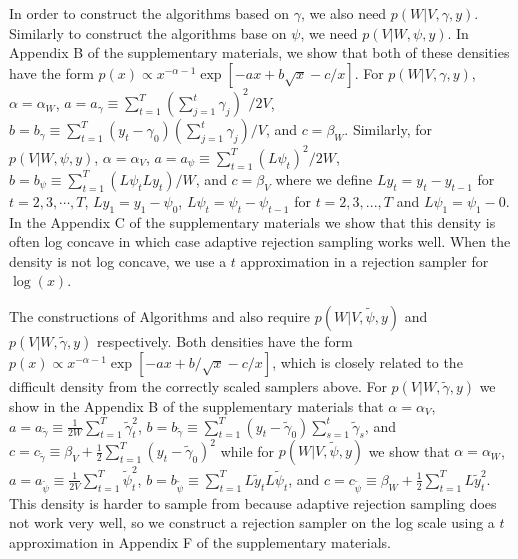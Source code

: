 \documentclass[12pt]{article}
\begin{document}
In order to construct the algorithms based on $\gamma$, we also need $p(W|V,\gamma,y)$. Similarly to construct the algorithms base on $\psi$, we need $p(V|W,\psi,y)$. In Appendix B of the supplementary materials, we show that both of these densities have the form $p(x)\propto x^{-\alpha-1}\exp\left[ -ax + b\sqrt{x} -c/x\right]$. For $p(W|V,\gamma,y)$, $\alpha=\alpha_W$, $a=a_\gamma \equiv \sum_{t=1}^T(\sum_{j=1}^t\gamma_j)^2/2V$, $b=b_\gamma \equiv\sum_{t=1}^T(y_t-\gamma_0)(\sum_{j=1}^t\gamma_j)/V$, and $c=\beta_W$. Similarly, for $p(V|W,\psi,y)$, $\alpha=\alpha_V$, $a=a_{\psi}\equiv\sum_{t=1}^T(L\psi_t)^2/2W$, $b=b_{\psi}\equiv\sum_{t=1}^T(L\psi_tLy_t)/W$, and $c=\beta_V$ where we define $Ly_t=y_t-y_{t-1}$ for $t=2,3,\cdots,T$, $Ly_1=y_1 - \psi_0$, $L\psi_t = \psi_t - \psi_{t-1}$ for $t=2,3,...,T$ and $L\psi_1=\psi_1-0$. In the Appendix C of the supplementary materials we show that this density is often log concave in which case adaptive rejection sampling \citep{gilks1992adaptive} works well. When the density is not log concave, we use a $t$ approximation in a rejection sampler for $\log(x)$.

The constructions of Algorithms  and  also require $p(W|V,\tilde{\psi},y)$ and $p(V|W,\tilde{\gamma},y)$ respectively. Both densities have the form $p(x)\propto x^{-\alpha-1}\exp\left[ -ax + b/\sqrt{x} -c/x\right]$, which is closely related to the difficult density from the correctly scaled samplers above.  For $p(V|W,\tilde{\gamma},y)$ we show in the Appendix B of the supplementary materials that $\alpha=\alpha_V$, $a = a_{\tilde{\gamma}}\equiv\frac{1}{2W}\sum_{t=1}^T\tilde{\gamma}_t^2$, $b =b_{\tilde{\gamma}}\equiv \sum_{t=1}^T(y_t - \tilde{\gamma}_0)\sum_{s=1}^t\tilde{\gamma}_s$, and $c =c_{\tilde{\gamma}}\equiv \beta_V + \frac{1}{2}\sum_{t=1}^T(y_t - \tilde{\gamma}_0)^2$ while for $p(W|V,\tilde{\psi},y)$ we show that $\alpha=\alpha_W$,   $a =a_{\tilde{\psi}}\equiv \frac{1}{2V}\sum_{t=1}^T\tilde{\psi}_t^2$,  $b =b_{\tilde{\psi}}\equiv \sum_{t=1}^TL\tilde{y}_tL\tilde{\psi}_t$, and $c =c_{\tilde{\psi}}\equiv \beta_W + \frac{1}{2}\sum_{t=1}^TL\tilde{y}_t^2$. This density is harder to sample from because adaptive rejection sampling does not work very well, so we construct a rejection sampler on the log scale using a $t$ approximation in Appendix F of the supplementary materials.

\end{document}
